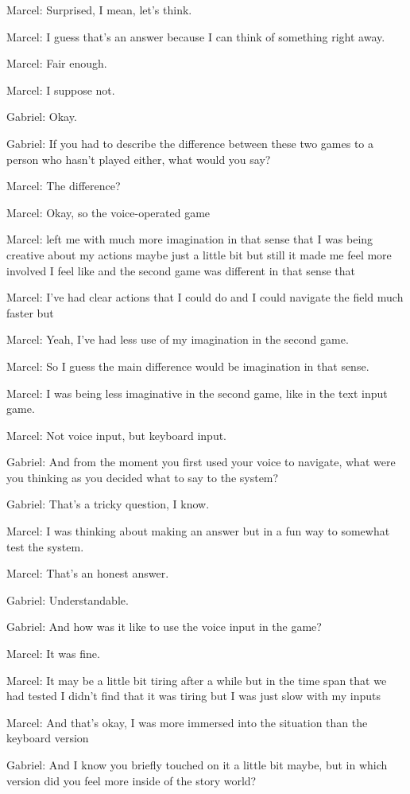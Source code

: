 Marcel: Surprised, I mean, let's think.

Marcel: I guess that's an answer because I can think of something right away.

Marcel: Fair enough.

Marcel: I suppose not.

Gabriel: Okay.

Gabriel: If you had to describe the difference between these two games to a person who hasn't played either, what would you say?

Marcel: The difference?

Marcel: Okay, so the voice-operated game

Marcel: left me with much more imagination in that sense that I was being creative about my actions maybe just a little bit but still it made me feel more involved I feel like and the second game was different in that sense that

Marcel: I've had clear actions that I could do and I could navigate the field much faster but

Marcel: Yeah, I've had less use of my imagination in the second game.

Marcel: So I guess the main difference would be imagination in that sense.

Marcel: I was being less imaginative in the second game, like in the text input game.

Marcel: Not voice input, but keyboard input.

Gabriel: And from the moment you first used your voice to navigate, what were you thinking as you decided what to say to the system?

Gabriel: That's a tricky question, I know.

Marcel: I was thinking about making an answer but in a fun way to somewhat test the system.

Marcel: That's an honest answer.

Gabriel: Understandable.

Gabriel: And how was it like to use the voice input in the game?

Marcel: It was fine.

Marcel: It may be a little bit tiring after a while but in the time span that we had tested I didn't find that it was tiring but I was just slow with my inputs

Marcel: And that's okay, I was more immersed into the situation than the keyboard version

Gabriel: And I know you briefly touched on it a little bit maybe, but in which version did you feel more inside of the story world?

